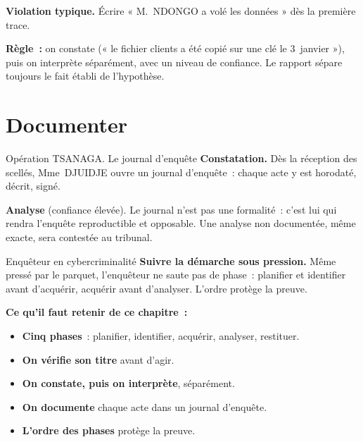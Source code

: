 \begin{boxalert}
\textbf{Violation typique.} Écrire « M.~NDONGO a volé les données » dès la
première trace.

\smallskip
\textbf{Règle~:} on constate (« le fichier clients a été copié sur une clé le
3~janvier »), puis on interprète séparément, avec un niveau de confiance. Le
rapport sépare toujours le fait établi de l'hypothèse.
\end{boxalert}

\section{Documenter}
\label{sec:c02-documenter}

\begin{boxscenario}{Opération TSANAGA. Le journal d'enquête}
\textbf{Constatation.} Dès la réception des scellés, Mme~DJUIDJE ouvre un
journal d'enquête~: chaque acte y est horodaté, décrit, signé.

\medskip
\textbf{Analyse} (confiance élevée). Le journal n'est pas une formalité~:
c'est lui qui rendra l'enquête reproductible et opposable. Une analyse non
documentée, même exacte, sera contestée au tribunal.
\end{boxscenario}

\begin{boxmetier}{Enquêteur en cybercriminalité}
\textbf{Suivre la démarche sous pression.} Même pressé par le parquet,
l'enquêteur ne saute pas de phase~: planifier et identifier avant d'acquérir,
acquérir avant d'analyser. L'ordre protège la preuve.
\end{boxmetier}

\separateur

\begin{boxresume}
\textbf{Ce qu'il faut retenir de ce chapitre~:}
\begin{itemize}
    \item \textbf{Cinq phases}~: planifier, identifier, acquérir, analyser,
          restituer.
    \item \textbf{On vérifie son titre} avant d'agir.
    \item \textbf{On constate, puis on interprète}, séparément.
    \item \textbf{On documente} chaque acte dans un journal d'enquête.
    \item \textbf{L'ordre des phases} protège la preuve.
\end{itemize}
\end{boxresume}

